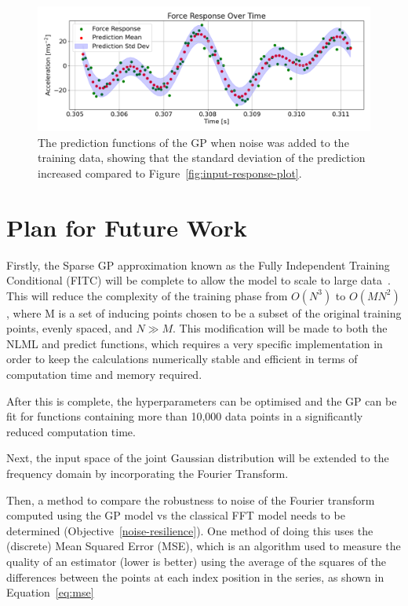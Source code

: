 \documentclass[12pt]{article}
\begin{document}
    \begin{figure}[ht]
        \centering
        \includegraphics[width=1.0\linewidth]{figures/input-response-noise/input-response-noise.png}
        \caption{The prediction functions of the GP when noise was added to the training data, showing that the standard deviation of the prediction increased compared to Figure~\ref{fig:input-response-plot}.}
        \label{fig:input-response-noise}
    \end{figure}

    \section{Plan for Future Work}
    Firstly, the Sparse GP approximation known as the Fully Independent Training Conditional (FITC) will be complete to allow the model to scale to large data~\cite{q-candela}.
    This will reduce the complexity of the training phase from $O(N^3)$ to $O(MN^2)$, where M is a set of inducing points chosen to be a subset of the original training points, evenly spaced, and $N \gg M$.  
    This modification will be made to both the NLML and predict functions, which requires a very specific implementation in order to keep the calculations numerically stable and efficient in terms of computation time and memory required.

    After this is complete, the hyperparameters can be optimised and the GP can be fit for functions containing more than 10,000 data points in a significantly reduced computation time.

    Next, the input space of the joint Gaussian distribution will be extended to the frequency domain by incorporating the Fourier Transform.

    Then, a method to compare the robustness to noise of the Fourier transform computed using the GP model vs the classical FFT model needs to be determined (Objective~\ref{noise-resilience}).
    One method of doing this uses the (discrete) Mean Squared Error (MSE), which is an algorithm used to measure the quality of an estimator (lower is better) using the average of the squares of the differences between the points at each index position in the series, as shown in Equation~\ref{eq:mse}
\end{document}
